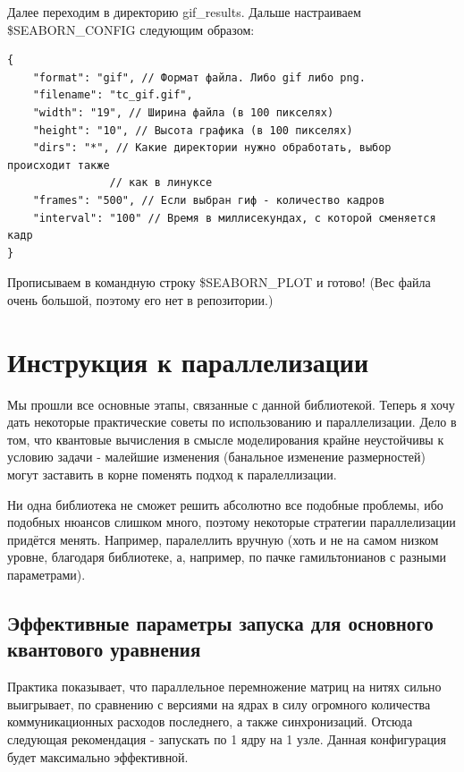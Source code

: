 \documentclass[12pt,fleqn]{article}
\begin{document}
    Далее переходим в директорию \textsf{gif\_results}. Дальше настраиваем \textsf{\$SEABORN\_CONFIG} следующим образом:

\begin{mdframed}[linecolor=black, topline=true, bottomline=true,
leftline=false, rightline=false]
\begin{verbatim}
{
    "format": "gif", // Формат файла. Либо gif либо png.
    "filename": "tc_gif.gif",
    "width": "19", // Ширина файла (в 100 пикселях)
    "height": "10", // Высота графика (в 100 пикселях)
    "dirs": "*", // Какие директории нужно обработать, выбор происходит также
                // как в линуксе
    "frames": "500", // Если выбран гиф - количество кадров
    "interval": "100" // Время в миллисекундах, с которой сменяется кадр
}
\end{verbatim}
\end{mdframed}

    Прописываем в командную строку \textsf{\$SEABORN\_PLOT} и готово! (Вес файла очень большой, поэтому его нет в репозитории.)

        \section{Инструкция к параллелизации}

        Мы прошли все основные этапы, связанные с данной библиотекой.
        Теперь я хочу дать некоторые практические советы по использованию и параллелизации. Дело в том, что квантовые вычисления в смысле 
        моделирования крайне неустойчивы к условию задачи - малейшие изменения (банальное изменение размерностей) могут заставить в корне поменять подход к паралеллизации.

        Ни одна библиотека не сможет решить абсолютно все подобные проблемы,
        ибо подобных нюансов слишком много, поэтому некоторые стратегии параллелизации придётся менять. Например, паралеллить вручную
        (хоть и не на самом низком уровне, благодаря библиотеке, а, например, по пачке гамильтонианов с разными параметрами).

        \subsection{Эффективные параметры запуска для основного квантового уравнения}

        Практика показывает, что параллельное перемножение матриц на нитях сильно выигрывает, 
        по сравнению с версиями на ядрах в силу огромного количества коммуникационных расходов последнего, а также синхронизаций. 
        Отсюда следующая рекомендация - запускать по 1 ядру на 1 узле. Данная конфигурация будет максимально эффективной.
\end{document}
